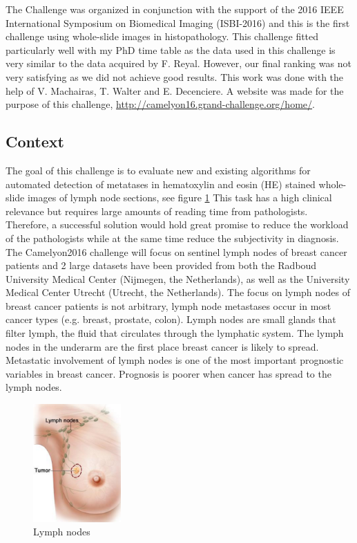\documentclass[a4paper,10pt]{article}
\begin{document}
The Challenge was organized in conjunction with the support of the 2016 IEEE International Symposium on Biomedical Imaging  (ISBI-2016) and this is the first challenge using whole-slide images in histopathology. This challenge fitted particularly well with my PhD time table as the data used in this challenge is very similar to the data acquired by F. Reyal. However, our final ranking was not very satisfying as we did not achieve good results. This work was done with the help of V. Machairas, T. Walter and E. Decenciere. A website was made for the purpose of this challenge, \url{http://camelyon16.grand-challenge.org/home/}.

\subsection{Context}
The goal of this challenge is to evaluate new and existing algorithms for automated detection of metatases in hematoxylin and eosin (HE) stained whole-slide images of lymph node sections, see figure \ref{LymphNode} This task has a high clinical relevance but requires large amounts of reading time from pathologists. Therefore, a successful solution would hold great promise to reduce the workload of the pathologists while at the same time reduce the subjectivity in diagnosis. The Camelyon2016 challenge will focus on sentinel lymph nodes of breast cancer patients and 2 large datasets have been provided from both the Radboud University Medical Center (Nijmegen, the Netherlands), as well as the University Medical Center Utrecht (Utrecht, the Netherlands). The focus on lymph nodes of breast cancer patients is not arbitrary, lymph node metastases occur in most cancer types (e.g. breast, prostate, colon). Lymph nodes are small glands that filter lymph, the fluid that circulates through the lymphatic system. The lymph nodes in the underarm are the first place breast cancer is likely to spread. Metastatic involvement of lymph nodes is one of the most important prognostic variables in breast cancer. Prognosis is poorer when cancer has spread to the lymph nodes.

\begin{figure}[!ht]
\centering
\includegraphics[width=0.3\textwidth]{Booby.png}
\caption{Lymph nodes}
\label{LymphNode}
\end{figure}
\end{document}
